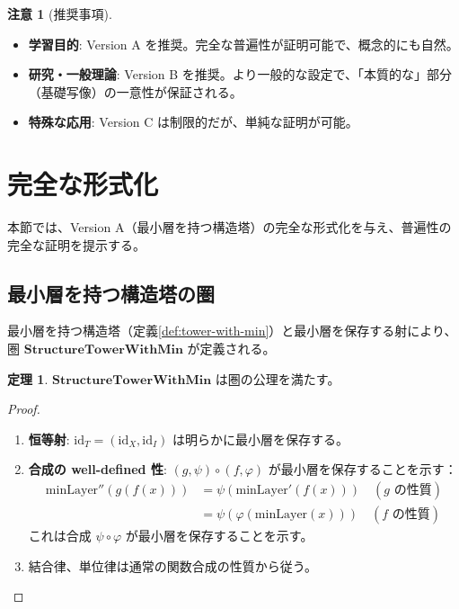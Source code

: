 \documentclass[a4paper,12pt]{ltjsarticle}
\theoremstyle{definition}
\newtheorem{theorem}[definition]{定理}
\newtheorem{remark}[definition]{注意}
\begin{document}
\begin{remark}[推奨事項]
\begin{itemize}
\item \textbf{学習目的}: Version A を推奨。完全な普遍性が証明可能で、概念的にも自然。
\item \textbf{研究・一般理論}: Version B を推奨。より一般的な設定で、「本質的な」部分（基礎写像）の一意性が保証される。
\item \textbf{特殊な応用}: Version C は制限的だが、単純な証明が可能。
\end{itemize}
\end{remark}

\section{完全な形式化}
\label{sec:cat2-complete}

本節では、Version A（最小層を持つ構造塔）の完全な形式化を与え、普遍性の完全な証明を提示する。

\subsection{最小層を持つ構造塔の圏}

最小層を持つ構造塔（定義\ref{def:tower-with-min}）と最小層を保存する射により、圏 $\mathbf{StructureTowerWithMin}$ が定義される。

\begin{theorem}
$\mathbf{StructureTowerWithMin}$ は圏の公理を満たす。
\end{theorem}

\begin{proof}
\begin{enumerate}
\item \textbf{恒等射}: $\mathrm{id}_T = (\mathrm{id}_X, \mathrm{id}_I)$ は明らかに最小層を保存する。
\item \textbf{合成の well-defined 性}: $(g, \psi) \circ (f, \varphi)$ が最小層を保存することを示す：
\begin{align*}
\mathrm{minLayer}''(g(f(x))) &= \psi(\mathrm{minLayer}'(f(x))) \quad (\text{$g$ の性質}) \\
&= \psi(\varphi(\mathrm{minLayer}(x))) \quad (\text{$f$ の性質})
\end{align*}
これは合成 $\psi \circ \varphi$ が最小層を保存することを示す。
\item 結合律、単位律は通常の関数合成の性質から従う。
\end{enumerate}
\end{proof}
\end{document}
